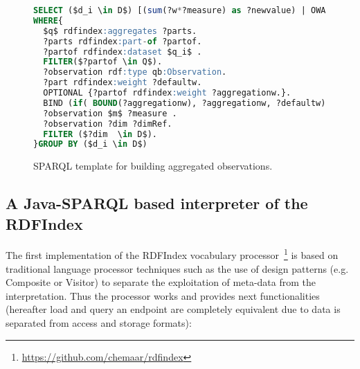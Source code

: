 \begin{figure}[!ht]
\begin{lstlisting}[language=SQL,basicstyle=\scriptsize,mathescape]  
SELECT ($d_i \in D$) [(sum(?w*?measure) as ?newvalue) | OWA(?measure)]
WHERE{
  $q$ rdfindex:aggregates ?parts.
  ?parts rdfindex:part-of ?partof.
  ?partof rdfindex:dataset $q_i$ .
  FILTER($?partof \in Q$).  
  ?observation rdf:type qb:Observation.
  ?part rdfindex:weight ?defaultw.     
  OPTIONAL {?partof rdfindex:weight ?aggregationw.}.
  BIND (if( BOUND(?aggregationw), ?aggregationw, ?defaultw) AS ?w)
  ?observation $m$ ?measure . 
  ?observation ?dim ?dimRef. 
  FILTER ($?dim  \in D$).
}GROUP BY ($d_i \in D$)
\end{lstlisting}
\caption{SPARQL template for building aggregated observations.}
 \label{fig:results-rdf-sparql-template}
\end{figure}


\subsection{A Java-SPARQL based interpreter of the RDFIndex}
The first implementation of the RDFIndex vocabulary processor~\footnote{\url{https://github.com/chemaar/rdfindex}} is based on traditional 
language processor techniques such as the use of design patterns (e.g. Composite or Visitor) 
to separate the exploitation of meta-data from the interpretation. Thus the processor 
works and provides next functionalities (hereafter load and query an endpoint are completely equivalent due to 
data is separated from access and storage formats):

